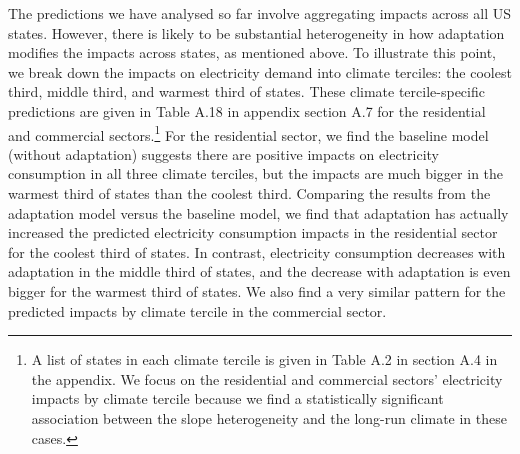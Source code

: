 \documentclass[11pt]{article}
\begin{document}
The predictions we have analysed so far involve aggregating impacts across all US states. However, there is likely to be substantial heterogeneity in how adaptation modifies the impacts across states, as mentioned above. To illustrate this point, we break down the impacts on electricity demand into climate terciles: the coolest third, middle third, and warmest third of states. These climate tercile-specific predictions are given in Table A.18 in appendix section A.7 for the residential and commercial sectors.\footnote{ A list of states in each climate tercile is given in Table A.2 in section A.4 in the appendix. We focus on the residential and commercial sectors' electricity impacts by climate tercile because we find a statistically significant association between the slope heterogeneity and the long-run climate in these cases.} For the residential sector, we find the baseline model (without adaptation) suggests there are positive impacts on electricity consumption in all three climate terciles, but the impacts are much bigger in the warmest third of states than the coolest third. Comparing the results from the adaptation model versus the baseline model, we find that adaptation has actually increased the predicted electricity consumption impacts in the residential sector for the coolest third of states. In contrast, electricity consumption decreases with adaptation in the middle third of states, and the decrease with adaptation is even bigger for the warmest third of states. We also find a very similar pattern for the predicted impacts by climate tercile in the commercial sector.%
\end{document}
